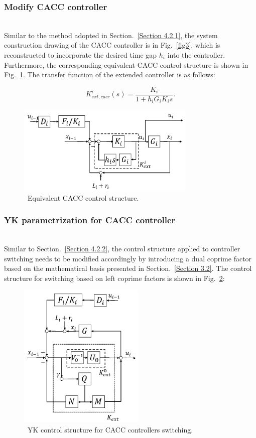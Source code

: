 \documentclass[journal]{IEEEtran}
\begin{document}
\subsubsection{Modify CACC controller}
\label{Section 4.2.3}
~\\

Similar to the method adopted in Section.~\ref{Section 4.2.1}, the system construction drawing of the CACC controller is in Fig.~\ref{fig3}, which is reconstructed to incorporate the desired time gap $h_i$ into the controller. Furthermore, the corresponding equivalent CACC control structure is shown in Fig.~\ref{fig7}. The transfer function of the extended controller is as follows:

\begin{equation}
  K_{e x t, c a c c}^{i}(s)=\frac{K_{i}}{1+h_{i} G_{i} K_{i} s}.
\end{equation}

\begin{figure}
  \centering
  \includegraphics[width=8.5cm]{figs/fig7.png}
  \caption{~Equivalent CACC control structure.}
  \label{fig7}
\end{figure}

\subsubsection{YK parametrization for CACC controller}
\label{Section 4.2.4}
~\\

Similar to Section.~\ref{Section 4.2.2}, the control structure applied to controller switching needs to be modified accordingly by introducing a dual coprime factor based on the mathematical basis presented in Section.~\ref{Section 3.2}. The control structure for switching based on left coprime factors is shown in Fig.~\ref{fig8}:

\begin{figure}
  \centering
  \includegraphics[width=6cm]{figs/fig8.png}
  \caption{~YK control structure for CACC controllers switching.}
  \label{fig8}
\end{figure}
\end{document}
